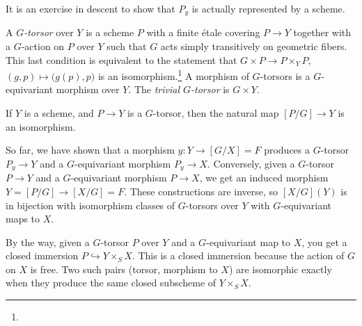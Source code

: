  It is an exercise in descent to show that $P_y$ is actually represented by a scheme.
 \begin{definition}
   A \emph{$G$-torsor} over $Y$ is a scheme $P$  with a
   finite \'etale covering $P\to Y$ together with a $G$-action on $P$ over $Y$ such that
   $G$ acts simply transitively on geometric fibers. This last condition is equivalent to
   the statement that $G\times P\to P\times_Y P$, $(g,p)\mapsto \bigl(g(p),p\bigr)$ is an
   isomorphism.\footnote{} A morphism of $G$-torsors is a $G$-equivariant morphism over
   $Y$. The \emph{trivial $G$-torsor} is $G\times Y$.
 \end{definition}
 \begin{lemma}
   If $Y$ is a scheme, and $P\to Y$ is a $G$-torsor, then the natural map $[P/G]\to Y$ is
   an isomorphism.
 \end{lemma}
 So far, we have shown that a morphism $y:Y\to [G/X]=F$ produces a $G$-torsor $P_y\to Y$
 and a $G$-equivariant morphism $P_y\to X$. Conversely, given a $G$-torsor $P\to Y$ and a
 $G$-equivariant morphism $P\to X$, we get an induced morphism $Y=[P/G]\to [X/G]=F$.
 These constructions are inverse, so $[X/G](Y)$ is in bijection with isomorphism classes
 of $G$-torsors over $Y$ with $G$-equivariant maps to $X$.

 By the way, given a $G$-torsor $P$ over $Y$ and a $G$-equivariant map to $X$, you get a
 closed immersion $P\hookrightarrow Y\times_S X$. This is a closed immersion because the
 action of $G$ on $X$ is free.   Two such
 pairs (torsor, morphism to $X$) are isomorphic exactly when they produce the same closed
 subscheme of $Y\times_S X$.

